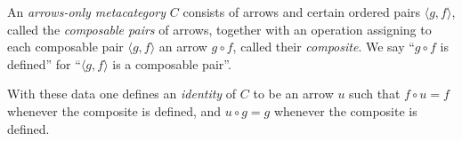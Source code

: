 An \emph{arrows-only metacategory} $C$ consists of arrows and certain ordered pairs $\langle g, f \rangle$, called the \emph{composable pairs} of arrows, together with an operation assigning to each composable pair $\langle g, f \rangle$ an arrow $g \circ f$, called their \emph{composite}. We say ``$g \circ f$ is defined'' for ``$\langle g, f \rangle$ is a composable pair''.

With these data one defines an \emph{identity} of $C$ to be an arrow $u$ such that $f \circ u = f$ whenever the composite is defined, and $u \circ g = g$ whenever the composite is defined.
